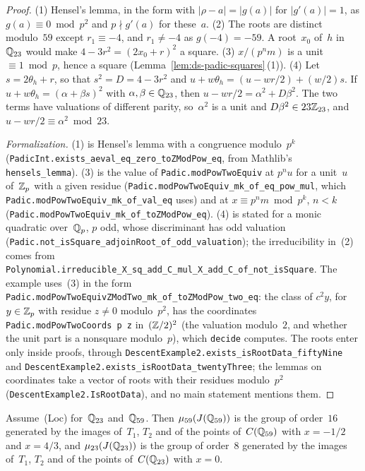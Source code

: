 \begin{proof}
\leanok
(1) Hensel's lemma, in the form with $\lvert \rho - a\rvert = \lvert g(a)\rvert$ for
$\lvert g'(a)\rvert = 1$, as $g(a) \equiv 0 \bmod p^2$ and $p \nmid g'(a)$ for these~$a$. (2) The
roots are distinct modulo~$59$ except $r_1 \equiv -4$, and $r_1 \ne -4$ as $g(-4) = -59$. A
root~$x_0$ of~$h$ in~$\mathbb{Q}_{23}$ would make $4 - 3r^2 = (2x_0 + r)^2$ a square. (3) $x/(p^n m)$ is
a unit $\equiv 1 \bmod p$, hence a square (Lemma~\ref{lem:ds-padic-squares}\,(1)). (4) Let
$s = 2\theta_h + r$, so that $s^2 = D = 4 - 3r^2$ and
$u + w\theta_h = (u - wr/2) + (w/2)s$. If $u + w\theta_h = (\alpha + \beta s)^2$ with
$\alpha, \beta \in \mathbb{Q}_{23}$, then $u - wr/2 = \alpha^2 + D\beta^2$. The two terms have
valuations of different parity, so~$\alpha^2$ is a unit and $D\beta^2 \in 23\mathbb{Z}_{23}$, and
$u - wr/2 \equiv \alpha^2 \bmod 23$.

\emph{Formalization.} (1) is Hensel's lemma with a congruence modulo~$p^k$
(\texttt{PadicInt.exists\_aeval\_eq\_zero\_toZModPow\_eq}, from Mathlib's
\texttt{hensels\_lemma}). (3) is the value of \texttt{Padic.modPowTwoEquiv} at $p^n u$ for a
unit~$u$ of~$\mathbb{Z}_p$ with a given residue (\texttt{Padic.modPowTwoEquiv\_mk\_of\_eq\_pow\_mul}, which
\texttt{Padic.modPowTwoEquiv\_mk\_of\_val\_eq} uses) and at $x \equiv p^n m \bmod p^k$, $n < k$
(\texttt{Padic.modPowTwoEquiv\_mk\_of\_toZModPow\_eq}). (4) is stated for a monic quadratic
over~$\mathbb{Q}_p$, $p$ odd, whose discriminant has odd valuation
(\texttt{Padic.not\_isSquare\_adjoinRoot\_of\_odd\_valuation}); the irreducibility in~(2) comes from
\texttt{Polynomial.irreducible\_X\_sq\_add\_C\_mul\_X\_add\_C\_of\_not\_isSquare}. The example
uses~(3) in the form \texttt{Padic.modPowTwoEquivZModTwo\_mk\_of\_toZModPow\_two\_eq}: the class
of $c^2 y$, for $y \in \mathbb{Z}_p$ with residue $z \ne 0$ modulo~$p^2$, has the coordinates
\texttt{Padic.modPowTwoCoords p z} in~$(\mathbb{Z}/2)^2$ (the valuation modulo~$2$, and whether the unit
part is a nonsquare modulo~$p$), which \texttt{decide} computes. The roots enter only inside
proofs, through \texttt{DescentExample2.exists\_isRootData\_fiftyNine} and
\texttt{DescentExample2.exists\_isRootData\_twentyThree}; the lemmas on coordinates take a vector
of roots with their residues modulo~$p^2$ (\texttt{DescentExample2.IsRootData}), and no main
statement mentions them.
\end{proof}

\begin{lemma}
\label{lem:ds-e2-local}
\leanok
{}
Assume~(Loc) for~$\mathbb{Q}_{23}$ and~$\mathbb{Q}_{59}$. Then $\mu_{59}(J(\mathbb{Q}_{59}))$ is the group of
order~$16$ generated by the images of~$T_1$, $T_2$ and of the points of~$C(\mathbb{Q}_{59})$ with
$x = -1/2$ and $x = 4/3$, and $\mu_{23}(J(\mathbb{Q}_{23}))$ is the group of order~$8$ generated by the
images of~$T_1$, $T_2$ and of the points of~$C(\mathbb{Q}_{23})$ with $x = 0$.
\end{lemma}

